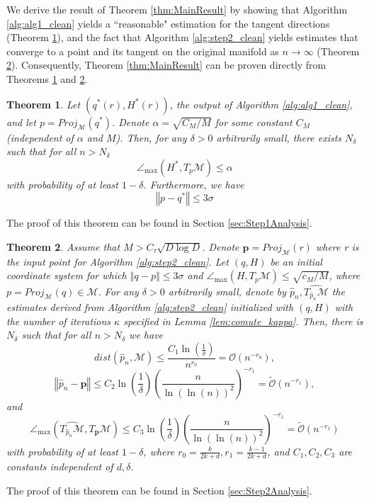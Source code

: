 \documentclass[12pt]{article}
\newtheorem{Theorem}{Theorem}[section]
\theoremstyle{remark}
\newcommand{\MM}{\mathcal{M}}
\newcommand{\norm}[1]{\left\Vert #1 \right\Vert}
\newcommand{\wtilde}[1]{\widetilde{#1}}
\newcommand{\maxangle}{\angle_{\max}}
\newcommand{\stau}{\tau}
\newcommand{\sM}{{M}}
\begin{document}
We derive the result of Theorem \ref{thm:MainResult} by showing that Algorithm \ref{alg:alg1_clean} yields a ``reasonable" estimation for the tangent directions (Theorem \ref{thm:Step1}), and the fact that Algorithm \ref{alg:step2_clean} yields estimates that converge to a point and its tangent on the original manifold as $n \to \infty$ (Theorem \ref{thm:Step2}). Consequently, Theorem \ref{thm:MainResult} can be proven directly from Theorems \ref{thm:Step1} and \ref{thm:Step2}.


\begin{Theorem}\label{thm:Step1}
	Let $ (q^*(r), H^*(r)) $, the output of Algorithm \ref{alg:alg1_clean}, and let $p = Proj_\MM(q^*)$. 
	Denote $\alpha = \sqrt{C_\sM/M}$ for some constant $C_\sM$ (independent of $\alpha$ and $M$).
	Then, for any $\delta>0$ arbitrarily small, there exists $ N_{\delta} $ such that for all $ n > N_{\delta} $ 
	\[\angle_{\max}(H^*, T_p\MM)\leq \alpha\]
	with probability of at least $ 1 - \delta $.
	Furthermore, we have
	\[
	\norm{p - q^*} \leq 3 \sigma
	\]
\end{Theorem}

The proof of this theorem can be found in Section \ref{sec:Step1Analysis}.
\begin{Theorem}\label{thm:Step2}
	Assume that $M>C_\stau\sqrt{D\log D}$.  Denote $\mathbf{p} = Proj_\MM (r)$ where r is the input point for Algorithm \ref{alg:step2_clean}.
	Let $(q, H)$ be an initial coordinate system for which $\norm{q - p}\leq 3 \sigma$ and $ \maxangle (H, T_p\MM) \leq \sqrt{c_\sM/M}$, where $p= Proj_\MM(q) \in \MM$.
	For any $\delta>0$ arbitrarily small, denote by $ \hat p_n, \widehat{T_{\hat p_n}\MM} $ the estimates derived from Algorithm \ref{alg:step2_clean} initialized with $(q,H)$ with the number of iterations $\kappa$ specified in Lemma \ref{lem:comute_kappa}. Then, there is $ N_{\delta} $ such that for all $ n > N_{\delta}  $ we have 
	\begin{equation}\label{eq:thm3.3_p_dist_bound}
		dist(\hat p_n, \MM) \leq \frac{C_1\ln\left(\frac{1}{\delta}\right)}{n^{r_0}}= \mathcal{O}(n^{-r_0}),
	\end{equation}
	\begin{equation}\label{eq:thm3.3_p_bound}
		\norm{\hat p_n - \mathbf{p}} \leq C_2\ln\left(\frac{1}{\delta}\right) \left(\frac{ n}{\ln\left(\ln(n) \right)^2}\right)^{-r_1} = \wtilde{\mathcal{O}}(n^{-r_1})  ,
	\end{equation}
	and 
	\begin{equation}\label{eq:thm3.3_tangent_ang}
		\angle_{\max}(\widehat{T_{\hat p_n}\MM},T_{\mathbf p}\MM) \leq C_3\ln\left(\frac{1}{\delta}\right) \left(\frac{ n}{\ln\left(\ln(n) \right)^2}\right)^{-r_1} = \wtilde{\mathcal{O}}(n^{-r_1})    
	\end{equation}
	with probability of at least $ 1 - \delta $, where $ r_0 = \frac{k}{2k +d}, r_1 = \frac{k-1}{2k +d} $, and $ C_1,C_2,C_3$ are constants independent of $d, \delta$. 
\end{Theorem}
The proof of this theorem can be found in Section \ref{sec:Step2Analysis}.
\end{document}
